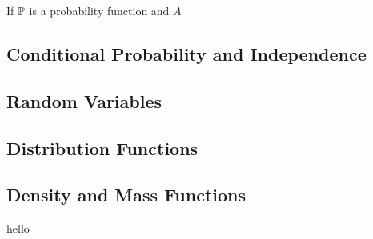 \begin{definition}

\end{definition}

\begin{theorem}
If $\mathbb P$ is a probability function and $A$ 

\end{theorem}

\subsection{Conditional Probability and Independence}

\subsection{Random Variables}

\subsection{Distribution Functions}

\subsection{Density and Mass Functions}

\begin{question}
hello
\end{question}